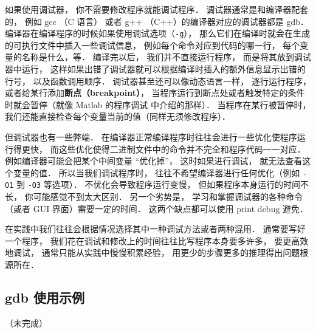如果使用调试器， 你不需要修改程序就能调试程序． 调试器通常是和编译器配套的， 例如 gcc （C 语言） 或者 g++ （C++）的编译器对应的调试器都是 gdb． 编译器在编译程序的时候如果使用调试选项（\verb|-g|）， 那么它们在编译时就会在生成的可执行文件中插入一些调试信息， 例如每个命令对应到代码的哪一行， 每个变量的名称是什么，等． 编译完以后， 我们并不直接运行程序， 而是将其放到调试器中运行， 这样如果出错了调试器就可以根据编译时插入的额外信息显示出错的行号， 以及函数调用顺序． 调试器甚至还可以像动态语言一样， 逐行运行程序， 或者给某行添加\textbf{断点（breakpoint）}， 当程序运行到断点处或者触发特定的条件时就会暂停（就像 Matlab 的程序调试 中介绍的那样）． 当程序在某行被暂停时， 我们还能直接检查每个变量当前的值（同样无须修改程序）．

但调试器也有一些弊端． 在编译器正常编译程序时往往会进行一些优化使程序运行得更快， 而这些优化使得二进制文件中的命令并不完全和程序代码一一对应． 例如编译器可能会把某个中间变量 “优化掉”， 这时如果进行调试， 就无法查看这个变量的值． 所以当我们调试程序时， 往往不希望编译器进行任何优化（例如 \verb|-O1| 到 \verb|-O3| 等选项）． 不优化会导致程序运行变慢， 但如果程序本身运行的时间不长， 你可能感觉不到太大区别． 另一个劣势是， 学习和掌握调试器的各种命令（或者 GUI 界面）需要一定的时间． 这两个缺点都可以使用 print debug 避免．

在实践中我们往往会根据情况选择其中一种调试方法或者两种混用． 通常要写好一个程序， 我们花在调试和修改上的时间往往比写程序本身要多许多， 要更高效地调试， 通常只能从实践中慢慢积累经验， 用更少的步骤更多的推理得出问题根源所在．

\subsection{gdb 使用示例}

（未完成）
